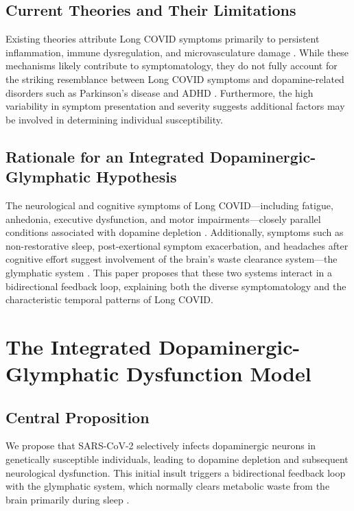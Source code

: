 \documentclass[12pt]{article}
\begin{document}
\subsection{Current Theories and Their Limitations}

Existing theories attribute Long COVID symptoms primarily to persistent inflammation, immune dysregulation, and microvasculature damage \citep{yang2021choroidplexus, crunfli2023astrocytes}. While these mechanisms likely contribute to symptomatology, they do not fully account for the striking resemblance between Long COVID symptoms and dopamine-related disorders such as Parkinson's disease and ADHD \citep{devine2022parkinsonscovid, gizer2009adhdgenes}. Furthermore, the high variability in symptom presentation and severity suggests additional factors may be involved in determining individual susceptibility.

\subsection{Rationale for an Integrated Dopaminergic-Glymphatic Hypothesis}

The neurological and cognitive symptoms of Long COVID—including fatigue, anhedonia, executive dysfunction, and motor impairments—closely parallel conditions associated with dopamine depletion \citep{brundin2020parkinsonmanagement, cappelletti2023dopamineblock}. Additionally, symptoms such as non-restorative sleep, post-exertional symptom exacerbation, and headaches after cognitive effort suggest involvement of the brain's waste clearance system—the glymphatic system \citep{Nedergaard2013, piantino2019}. This paper proposes that these two systems interact in a bidirectional feedback loop, explaining both the diverse symptomatology and the characteristic temporal patterns of Long COVID.

\section{The Integrated Dopaminergic-Glymphatic Dysfunction Model}

\subsection{Central Proposition}

We propose that SARS-CoV-2 selectively infects dopaminergic neurons in genetically susceptible individuals, leading to dopamine depletion and subsequent neurological dysfunction. This initial insult triggers a bidirectional feedback loop with the glymphatic system, which normally clears metabolic waste from the brain primarily during sleep \citep{Xie2013}. 
\end{document}
